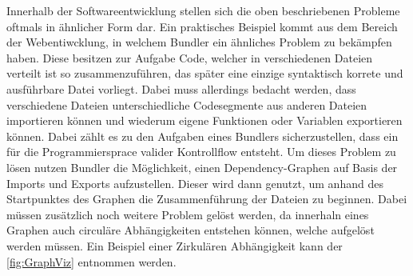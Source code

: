 \documentclass[
	12pt,
	BCOR=5mm,
	DIV=12,
	headinclude=on,
	footinclude=off,
	parskip=half,
	bibliography=totoc,
	listof=entryprefix,
	toc=listof,
	numbers=noenddot,
	plainfootsepline
]{scrreprt}
\begin{document}
Innerhalb der Softwareentwicklung stellen sich die oben beschriebenen Probleme oftmals in ähnlicher Form dar. Ein praktisches Beispiel kommt aus dem Bereich der Webentiwcklung, in welchem Bundler ein ähnliches Problem zu bekämpfen haben. Diese besitzen zur Aufgabe Code, welcher in verschiedenen Dateien verteilt ist so zusammenzuführen, das später eine einzige syntaktisch korrete und ausführbare Datei vorliegt. Dabei muss allerdings bedacht werden, dass verschiedene Dateien unterschiedliche Codesegmente aus anderen Dateien importieren können und wiederum eigene Funktionen oder Variablen exportieren können. Dabei zählt es zu den Aufgaben eines Bundlers sicherzustellen, dass ein für die Programmiersprace valider Kontrollflow entsteht. Um dieses Problem zu lösen nutzen Bundler die Möglichkeit, einen Dependency-Graphen auf Basis der Imports und Exports aufzustellen. Dieser wird dann genutzt, um anhand des Startpunktes des Graphen die Zusammenführung der Dateien zu beginnen. Dabei müssen zusätzlich noch weitere Problem gelöst werden, da innerhaln eines Graphen auch circuläre Abhängigkeiten entstehen können, welche aufgelöst werden müssen. Ein Beispiel einer Zirkulären Abhängigkeit kann der \autoref{fig:GraphViz} entnommen werden.
\end{document}
